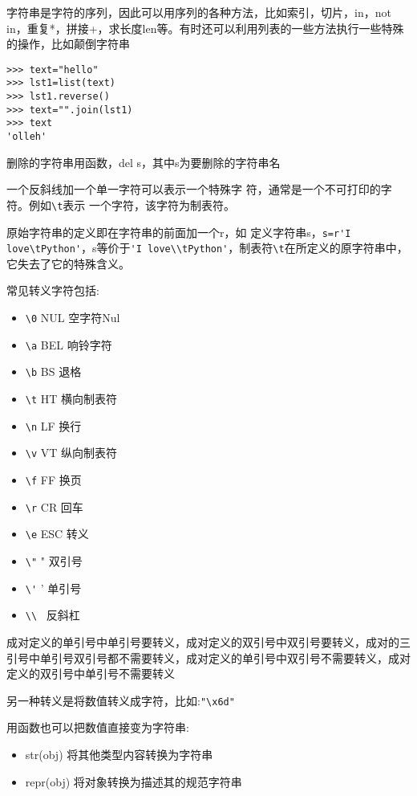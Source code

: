\documentclass[twoside,11pt]{book}
\begin{document}
字符串是字符的序列，因此可以用序列的各种方法，比如索引，切片，in，not in，重复*，拼接+，求长度len等。有时还可以利用列表的一些方法执行一些特殊的操作，比如颠倒字符串
\begin{lstlisting}
>>> text="hello"
>>> lst1=list(text)
>>> lst1.reverse()
>>> text="".join(lst1)
>>> text
'olleh'
\end{lstlisting}


删除的字符串用函数，del s，其中s为要删除的字符串名

一个反斜线加一个单一字符可以表示一个特殊字
符，通常是一个不可打印的字符。例如\verb|\t|表示
一个字符，该字符为制表符。

原始字符串的定义即在字符串的前面加一个r，如
定义字符串s，\verb|s=r'I love\tPython'|，s等价于\verb|'I love\\tPython'|，制表符\verb|\t|在所定义的原字符串中，它失去了它的特殊含义。

常见转义字符包括:
\begin{itemize}
  \item \verb|\0| NUL 空字符Nul
  \item \verb|\a| BEL 响铃字符
  \item \verb|\b| BS 退格
  \item \verb|\t| HT 横向制表符
  \item \verb|\n| LF 换行
  \item \verb|\v| VT 纵向制表符
  \item \verb|\f| FF 换页
  \item \verb|\r| CR 回车
  \item \verb|\e| ESC 转义
  \item \verb|\"| " 双引号
  \item \verb|\'| ' 单引号
  \item \verb|\\| \ 反斜杠
\end{itemize}

成对定义的单引号中单引号要转义，成对定义的双引号中双引号要转义，成对的三引号中单引号双引号都不需要转义，成对定义的单引号中双引号不需要转义，成对定义的双引号中单引号不需要转义

另一种转义是将数值转义成字符，比如:\verb|"\x6d"|

用函数也可以把数值直接变为字符串:
\begin{itemize}
  \item str(obj) 将其他类型内容转换为字符串
  \item repr(obj) 将对象转换为描述其的规范字符串
\end{itemize}
\end{document}
